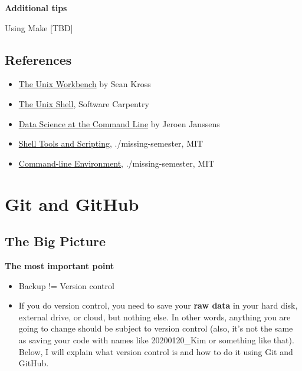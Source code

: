\documentclass[
]{book}
\begin{document}
\textbf{Additional tips}

Using Make {[}TBD{]}

\hypertarget{references}{%
\subsection{References}\label{references}}

\begin{itemize}
\item
  \href{https://seankross.com/the-unix-workbench/}{The Unix Workbench} by Sean Kross
\item
  \href{http://swcarpentry.GitHub.io/shell-novice/}{The Unix Shell}, Software Carpentry
\item
  \href{https://www.datascienceatthecommandline.com/1e/}{Data Science at the Command Line} by Jeroen Janssens
\end{itemize}

\begin{itemize}
\item
  \href{https://missing.csail.mit.edu/2020/shell-tools/}{Shell Tools and Scripting}, ./missing-semester, MIT
\item
  \href{https://missing.csail.mit.edu/2020/command-line/}{Command-line Environment}, ./missing-semester, MIT
\end{itemize}

\hypertarget{git-and-github}{%
\section{Git and GitHub}\label{git-and-github}}

\hypertarget{the-big-picture-1}{%
\subsection{The Big Picture}\label{the-big-picture-1}}

\textbf{The most important point}

\begin{itemize}
\item
  Backup != Version control
\item
  If you do version control, you need to save your \textbf{raw data} in your hard disk, external drive, or cloud, but nothing else. In other words, anything you are going to change should be subject to version control (also, it's not the same as saving your code with names like 20200120\_Kim or something like that). Below, I will explain what version control is and how to do it using Git and GitHub.
\end{itemize}
\end{document}
